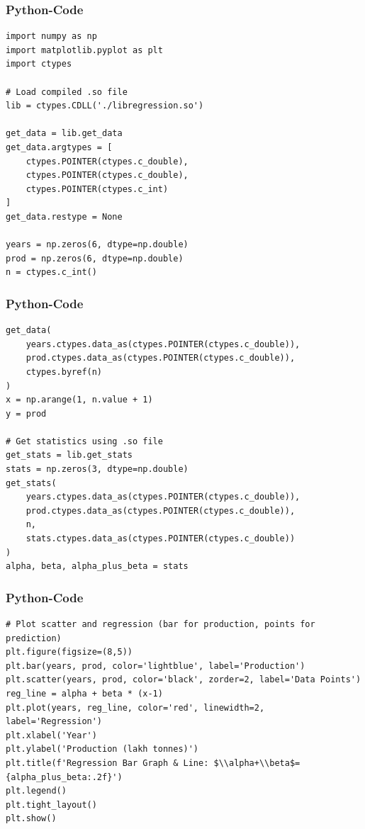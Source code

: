 \documentclass{beamer}
\begin{document}
\begin{frame}[fragile]
\frametitle{Python-Code}
\begin{lstlisting}
import numpy as np
import matplotlib.pyplot as plt
import ctypes

# Load compiled .so file  
lib = ctypes.CDLL('./libregression.so')

get_data = lib.get_data
get_data.argtypes = [
    ctypes.POINTER(ctypes.c_double),
    ctypes.POINTER(ctypes.c_double),
    ctypes.POINTER(ctypes.c_int)
]
get_data.restype = None

years = np.zeros(6, dtype=np.double)
prod = np.zeros(6, dtype=np.double)
n = ctypes.c_int()

\end{lstlisting}
\end{frame}
\begin{frame}[fragile]
\frametitle{Python-Code}
\begin{lstlisting}
get_data(
    years.ctypes.data_as(ctypes.POINTER(ctypes.c_double)),
    prod.ctypes.data_as(ctypes.POINTER(ctypes.c_double)),
    ctypes.byref(n)
)
x = np.arange(1, n.value + 1)
y = prod

# Get statistics using .so file
get_stats = lib.get_stats
stats = np.zeros(3, dtype=np.double)
get_stats(
    years.ctypes.data_as(ctypes.POINTER(ctypes.c_double)),
    prod.ctypes.data_as(ctypes.POINTER(ctypes.c_double)),
    n,
    stats.ctypes.data_as(ctypes.POINTER(ctypes.c_double))
)
alpha, beta, alpha_plus_beta = stats
\end{lstlisting}
\end{frame}
\begin{frame}[fragile]
\frametitle{Python-Code}
\begin{lstlisting}
# Plot scatter and regression (bar for production, points for prediction)
plt.figure(figsize=(8,5))
plt.bar(years, prod, color='lightblue', label='Production')
plt.scatter(years, prod, color='black', zorder=2, label='Data Points')
reg_line = alpha + beta * (x-1)
plt.plot(years, reg_line, color='red', linewidth=2, label='Regression')
plt.xlabel('Year')
plt.ylabel('Production (lakh tonnes)')
plt.title(f'Regression Bar Graph & Line: $\\alpha+\\beta$={alpha_plus_beta:.2f}')
plt.legend()
plt.tight_layout()
plt.show()
\end{lstlisting}
\end{frame}
\end{document}
